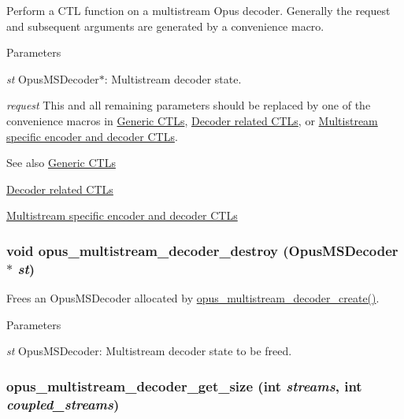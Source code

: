 Perform a CTL function on a multistream Opus decoder. Generally the request and subsequent arguments are generated by a convenience macro. 
\begin{DoxyParams}{Parameters}
\item[{\em st}]{\ttfamily OpusMSDecoder$\ast$}: Multistream decoder state. \item[{\em request}]This and all remaining parameters should be replaced by one of the convenience macros in \hyperlink{group__opus__genericctls}{Generic CTLs}, \hyperlink{group__opus__decoderctls}{Decoder related CTLs}, or \hyperlink{group__opus__multistream__ctls}{Multistream specific encoder and decoder CTLs}. \end{DoxyParams}
\begin{DoxySeeAlso}{See also}
\hyperlink{group__opus__genericctls}{Generic CTLs} 

\hyperlink{group__opus__decoderctls}{Decoder related CTLs} 

\hyperlink{group__opus__multistream__ctls}{Multistream specific encoder and decoder CTLs} 
\end{DoxySeeAlso}
\hypertarget{group__opus__multistream_gaaec72b484eabc78d7869221c6d2ce080}{
\subsubsection[{opus\_\-multistream\_\-decoder\_\-destroy}]{\setlength{\rightskip}{0pt plus 5cm}void opus\_\-multistream\_\-decoder\_\-destroy ({\bf OpusMSDecoder} $\ast$ {\em st})}}
\label{group__opus__multistream_gaaec72b484eabc78d7869221c6d2ce080}


Frees an {\ttfamily OpusMSDecoder} allocated by \hyperlink{group__opus__multistream_ga3c0e342774174c471e61cedba53755c9}{opus\_\-multistream\_\-decoder\_\-create()}. 
\begin{DoxyParams}{Parameters}
\item[{\em st}]{\ttfamily OpusMSDecoder}: Multistream decoder state to be freed. \end{DoxyParams}
\hypertarget{group__opus__multistream_ga38d745963e7903890c80278bc2569c39}{
\subsubsection[{opus\_\-multistream\_\-decoder\_\-get\_\-size}]{ opus\_\-multistream\_\-decoder\_\-get\_\-size (int {\em streams}, \/  int {\em coupled\_\-streams})}}
\label{group__opus__multistream_ga38d745963e7903890c80278bc2569c39}


